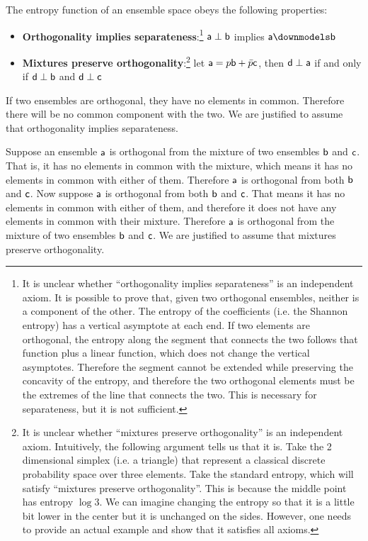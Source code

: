 \begin{axiom}
	The entropy function of an ensemble space obeys the following properties:
	\begin{itemize}
		\item \textbf{Orthogonality implies separateness}:\footnote{It is unclear whether ``orthogonality implies separateness'' is an independent axiom. It is possible to prove that, given two orthogonal ensembles, neither is a component of the other. The entropy of the coefficients (i.e. the Shannon entropy) has a vertical asymptote at each end. If two elements are orthogonal, the entropy along the segment that connects the two follows that function plus a linear function, which does not change the vertical asymptotes. Therefore the segment cannot be extended while preserving the concavity of the entropy, and therefore the two orthogonal elements must be the extremes of the line that connects the two. This is necessary for separateness, but it is not sufficient.} $\ens[a] \ortho \ens[b]$ implies $\ens[a] \separate \ens[b]$
		\item \textbf{Mixtures preserve orthogonality}:\footnote{It is unclear whether ``mixtures preserve orthogonality'' is an independent axiom. Intuitively, the following argument tells us that it is. Take the 2 dimensional simplex (i.e. a triangle) that represent a classical discrete probability space over three elements. Take the standard entropy, which will satisfy ``mixtures preserve orthogonality''. This is because the middle point has entropy $\log 3$. We can imagine changing the entropy so that it is a little bit lower in the center but it is unchanged on the sides. However, one needs to provide an actual example and show that it satisfies all axioms.} let $\ens[a] = p \ens[b] + \bar{p} \ens[c]$, then $\ens[d] \ortho \ens[a]$ if and only if $\ens[d] \ortho \ens[b]$ and $\ens[d] \ortho \ens[c]$
	\end{itemize}
\end{axiom}

\begin{justification}
	If two ensembles are orthogonal, they have no elements in common. Therefore there will be no common component with the two. We are justified to assume that orthogonality implies separateness.
	
	Suppose an ensemble $\ens[a]$ is orthogonal from the mixture of two ensembles $\ens[b]$ and $\ens[c]$. That is, it has no elements in common with the mixture, which means it has no elements in common with either of them. Therefore $\ens[a]$ is orthogonal from both $\ens[b]$ and $\ens[c]$. Now suppose $\ens[a]$ is orthogonal from both $\ens[b]$ and $\ens[c]$. That means it has no elements in common with either of them, and therefore it does not have any elements in common with their mixture. Therefore $\ens[a]$ is orthogonal from the mixture of two ensembles $\ens[b]$ and $\ens[c]$. We are justified to assume that mixtures preserve orthogonality.
\end{justification}

